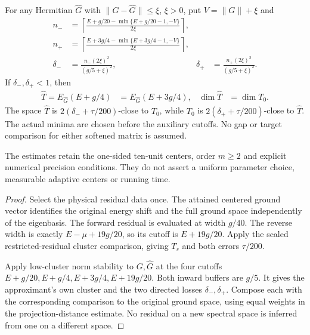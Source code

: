\begin{lemma}
    For any Hermitian $\widehat G$ with $\|G-\widehat G\|\le\xi$,
    $\xi>0$, put $V=\|G\|+\xi$ and
    \begin{align}
        n_-      & =\left\lceil\frac{E+g/20-\min\{E+g/20-1,-V\}}{2\xi}\right\rceil,                                     \\
        n_+      & =\left\lceil\frac{E+3g/4-\min\{E+3g/4-1,-V\}}{2\xi}\right\rceil,                                     \\
        \delta_- & =\frac{n_-(2\xi)^2}{(g/5+\xi)^2},
                 & \delta_+                                                         & =\frac{n_+(2\xi)^2}{(g/5+\xi)^2}.
    \end{align}
    If $\delta_-,\delta_+<1$, then
    \begin{align}
        \widehat T=E_{\widehat G}(E+g/4)
         & =E_{\widehat G}(E+3g/4),
         & \dim\widehat T           & =\dim T_0.
    \end{align}
    The space $\widehat T$ is $2(\delta_-+\tau/200)$-close to $T_0$,
    while $T_0$ is $2(\delta_++\tau/200)$-close to $\widehat T$.
    The actual minima are chosen before the auxiliary cutoffs.
    No gap or target comparison for either softened matrix is assumed.

    The estimates retain the one-sided ten-unit centers, order $m\ge2$
    and explicit numerical precision conditions. They do not assert a
    uniform parameter choice, measurable adaptive centers or running time.
\end{lemma}
\begin{proof}\leanok
    Select the physical residual data once. The attained centered ground
    vector identifies the original energy shift and the full ground space
    independently of the eigenbasis. The forward residual is evaluated at
    width $g/40$. The reverse width is exactly $E-\mu+19g/20$, so its
    cutoff is $E+19g/20$. Apply the scaled restricted-residual cluster
    comparison, giving $T_s$ and both errors $\tau/200$.

    Apply low-cluster norm stability to $G,\widehat G$ at the four
    cutoffs $E+g/20,E+g/4,E+3g/4,E+19g/20$. Both inward buffers are
    $g/5$. It gives the approximant's own cluster and the two directed
    losses $\delta_-,\delta_+$. Compose each with the corresponding
    comparison to the original ground space, using equal weights in the
    projection-distance estimate. No residual on a new spectral space
    is inferred from one on a different space.
\end{proof}
